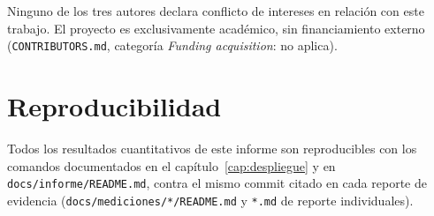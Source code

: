 Ninguno de los tres autores declara conflicto de intereses en relaci\'on
con este trabajo. El proyecto es exclusivamente acad\'emico, sin
financiamiento externo (\texttt{CONTRIBUTORS.md}, categor\'ia \emph{Funding
acquisition}: no aplica).

\section{Reproducibilidad}

Todos los resultados cuantitativos de este informe son reproducibles con
los comandos documentados en el cap\'itulo~\ref{cap:despliegue} y en
\texttt{docs/informe/README.md}, contra el mismo commit citado en cada
reporte de evidencia (\texttt{docs/mediciones/*/README.md} y
\texttt{*.md} de reporte individuales).
